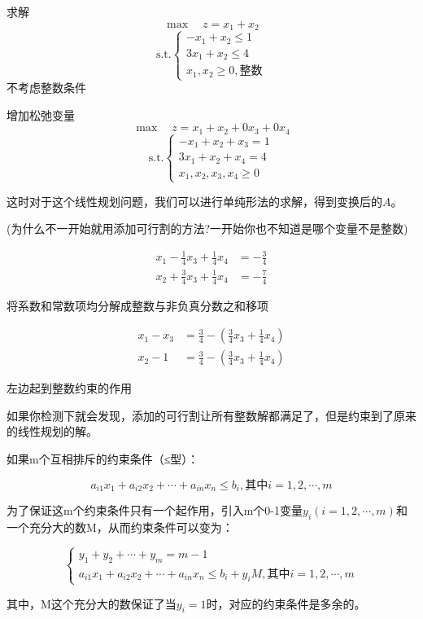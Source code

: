 \documentclass[12pt, a4paper, oneside, UTF8]{ctexbook}
\begin{document}
\begin{example}
    求解
\[
\max \quad z = x_1 + x_2
\]
\[
\text{s.t.} \begin{cases}
- x_1 + x_2 \leq 1 \\
3x_1 + x_2 \leq 4 \\
x_1, x_2 \geq 0, \text{整数}
\end{cases}
\]
不考虑整数条件

增加松弛变量
\[
\max \quad z = x_1 + x_2 + 0x_3 + 0x_4
\]
\[
\text{s.t.} \begin{cases}
- x_1 + x_2 + x_3 = 1 \\
3x_1 + x_2 + x_4 = 4 \\
x_1, x_2, x_3, x_4 \geq 0
\end{cases}
\]
\end{example}

这时对于这个线性规划问题，我们可以进行单纯形法的求解，得到变换后的$A$。

(为什么不一开始就用添加可行割的方法?一开始你也不知道是哪个变量不是整数)

\begin{align*}
    x_1 - \frac{1}{4}x_3 + \frac{1}{4}x_4 &= -\frac{3}{4} \\
    x_2 + \frac{3}{4}x_3 + \frac{1}{4}x_4 &= -\frac{7}{4}
    \end{align*}
    
    将系数和常数项均分解成整数与非负真分数之和移项
    
\begin{align*}
    x_1 - x_3 &= \frac{3}{4} - \left( \frac{3}{4}x_3 + \frac{1}{4}x_4 \right) \\
    x_2 - 1 &= \frac{3}{4} - \left( \frac{3}{4}x_3 + \frac{1}{4}x_4 \right)
\end{align*}

\begin{remark}
    左边起到整数约束的作用
\end{remark}

如果你检测下就会发现，添加的可行割让所有整数解都满足了，但是约束到了原来的线性规划的解。

\begin{example}
    如果m个互相排斥的约束条件（≤型）：

\[ a_{i1}x_1 + a_{i2}x_2 + \cdots + a_{in}x_n \leq b_i, \text{其中} i = 1, 2, \cdots, m \]

为了保证这m个约束条件只有一个起作用，引入m个0-1变量\( y_i (i = 1, 2, \cdots, m) \)和一个充分大的数M，从而约束条件可以变为：

\[
\begin{cases}
y_1 + y_2 + \cdots + y_m = m - 1 \\
a_{i1}x_1 + a_{i2}x_2 + \cdots + a_{in}x_n \leq b_i + y_iM, \text{其中} i = 1, 2, \cdots, m
\end{cases}
\]

其中，M这个充分大的数保证了当\( y_i = 1 \)时，对应的约束条件是多余的。
\end{example}
\end{document}
